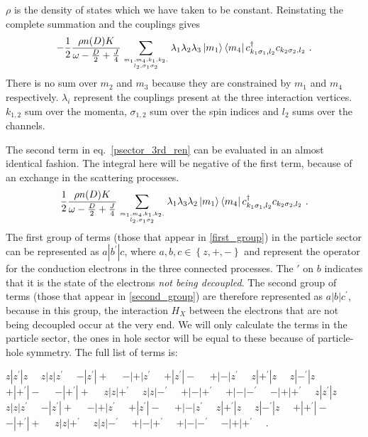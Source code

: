 \documentclass[reprint,onecolumn,prb,superscriptaddress]{revtex4-2}
\begin{document}
\(\rho\) is the density of states which we have taken to be constant. Reinstating the complete summation and the couplings gives
\begin{equation}\begin{aligned}
	\label{first_group}
	-\frac{1}{2}\frac{\rho n(D) K}{\omega - \frac{D}{2} + \frac{J}{4}}\sum_{m_1,m_4,k_1,k_2,\atop{l_2,\sigma_1\sigma_2}}\lambda_{1}\lambda_{2}\lambda_{3}\ket{m_1}\bra{m_4}c^\dagger_{k_1 \sigma_1, l_2}c_{k_2 \sigma_2,l_2}~.
\end{aligned}\end{equation}
There is no sum over \(m_2\) and \(m_3\) because they are constrained by \(m_1\) and \(m_4\) respectively. \(\lambda_i\) represent the couplings present at the three interaction vertices. \(k_{1,2}\) sum over the momenta, \(\sigma_{1,2}\) sum over the spin indices and \(l_2\) sums over the channels.

The second term in eq.~\ref{psector_3rd_ren} can be evaluated in an almost identical fashion. The integral here will be negative of the first term, because of an exchange in the scattering processes.
\begin{equation}\begin{aligned}
	\label{second_group}
	\frac{1}{2}\frac{\rho n(D) K}{\omega - \frac{D}{2} + \frac{J}{4}}\sum_{m_1,m_4,k_1,k_2,\atop{l_2,\sigma_1\sigma_2}}\lambda_{1}\lambda_{3}\lambda_{2}\ket{m_1}\bra{m_4}c^\dagger_{k_1 \sigma_1, l_2}c_{k_2 \sigma_2,l_2}~.
\end{aligned}\end{equation}
The first group of terms (those that appear in \ref{first_group}) in the particle sector can be represented as \(a|b^\prime|c\), where \(a,b,c \in \left\{z,+,-\right\} \) and represent the operator for the conduction electrons in the three connected processes. The \(\prime\) on \(b\) indicates that it is the state of the electrons \textit{not being decoupled}. The second group of terms (those that appear in \ref{second_group}) are therefore represented as \(a|b|c^\prime\), because in this group, the interaction \(H_X\) between the electrons that are not being decoupled occur at the very end.
We will only calculate the terms in the particle sector, the ones in hole sector will be equal to these because of particle-hole symmetry. The full list of terms is: 


$z|z^\prime|z\quad$
$z|z|z^\prime\quad$
$-|z^\prime|+\quad$
$-|+|z^\prime\quad$
$+|z^\prime|-\quad$
$+|-|z^\prime\quad$
$ z|+^\prime|z\quad$
$z|-^\prime|z\quad$
$+|+^\prime|-\quad$
$-|+^\prime|+\quad$
$z|z|+^\prime\quad$
$z|z|-^\prime\quad$
$ +|-|+^\prime\quad$
$+|-|-^\prime\quad$
$-|+|+^\prime\quad$
$z|z^\prime|z\quad$
$z|z|z^\prime\quad$
$-|z^\prime|+\quad$
$ -|+|z^\prime\quad$
$+|z^\prime|-\quad$
$+|-|z^\prime\quad$
$z|+^\prime|z\quad$
$z|-^\prime|z\quad$
$+|+^\prime|-\quad$
$-|+^\prime|+\quad$
$z|z|+^\prime\quad$
$z|z|-^\prime\quad$
$+|-|+^\prime\quad$
$+|-|-^\prime\quad$
$-|+|+^\prime\quad$
.
\end{document}

